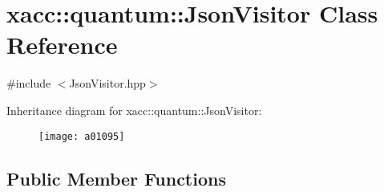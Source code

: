 \hypertarget{a01095}{}\section{xacc\+:\+:quantum\+:\+:Json\+Visitor Class Reference}
\label{a01095}


{\ttfamily \#include $<$Json\+Visitor.\+hpp$>$}

Inheritance diagram for xacc\+:\+:quantum\+:\+:Json\+Visitor\+:\begin{figure}[H]
\begin{center}
\leavevmode
\texttt{[image: a01095]}
\end{center}
\end{figure}
\subsection*{Public Member Functions}
